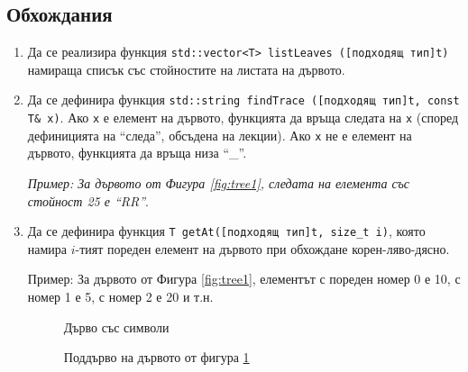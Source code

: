 \subsection {Обхождания}
\begin{enumerate}[resume]

  \item Да се реализира функция \texttt{std::vector<T> listLeaves ([подходящ тип]t)} намираща списък със стойностите на листата на дървото.

  \item Да се дефинира функция \texttt{std::string findTrace ([подходящ тип]t, const T\& x)}. Ако \texttt{x} е елемент на дървото, функцията да връща следата на \texttt{x} (според дефиницията на ``следа'', обсъдена на лекции). Ако \texttt{x} не е елемент на дървото, функцията да връща низа ``\_''.

  \textit{Пример: За дървото от Фигура \ref{fig:tree1}, следата на елемента със стойност 25 е ``RR''}.
    
  \item Да се дефинира функция \texttt{T getAt([подходящ тип]t, size\_t i)}, която намира $i$-тият пореден елемент на дървото при обхождане корен-ляво-дясно.
  
  Пример: За дървото от Фигура \ref{fig:tree1}, елементът с пореден номер 0 е 10, с номер 1 е 5, с номер 2 е 20 и т.н.


  \begin{figure}
    \centering
    \caption{Дърво със символи}
    \label{fig:chartree}
    \end{figure}
    
    \begin{figure}
      \centering
      \caption{Поддърво на дървото от фигура \ref{fig:chartree}}
      \label{fig:subtree}
      \end{figure}


\end{enumerate}
